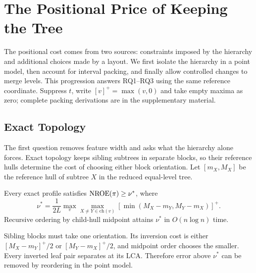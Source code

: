 \section{The Positional Price of Keeping the Tree}\label{sec:bounds}
The positional cost comes from two sources: constraints imposed by the hierarchy and additional choices made by a layout. We first isolate the hierarchy in a point model, then account for interval packing, and finally allow controlled changes to merge levels. This progression answers RQ1--RQ3 using the same reference coordinate. Suppress $t$, write $[v]^+=\max(v,0)$ and take empty maxima as zero; complete packing derivations are in the supplementary material.

\subsection{Exact Topology}
The first question removes feature width and asks what the hierarchy alone forces. Exact topology keeps sibling subtrees in separate blocks, so their reference hulls determine the cost of choosing either block orientation. Let $[m_X,M_X]$ be the reference hull of subtree $X$ in the reduced equal-level tree.
\begin{theorem}\label{thm:order}
Every exact profile satisfies $\mathrm{NROE}(\pi)\ge\nu^*$, where
\begin{equation}\label{eq:nu}
\nu^*=\frac{1}{2L}\max_v\max_{X\ne Y\in\mathrm{ch}(v)}[\min(M_X-m_Y,M_Y-m_X)]^+.
\end{equation}
Recursive ordering by child-hull midpoint attains $\nu^*$ in $O(n\log n)$ time.
\end{theorem}
Sibling blocks must take one orientation. Its inversion cost is either $[M_X-m_Y]^+/2$ or $[M_Y-m_X]^+/2$, and midpoint order chooses the smaller. Every inverted leaf pair separates at its LCA. Therefore error above $\nu^*$ can be removed by reordering in the point model.

